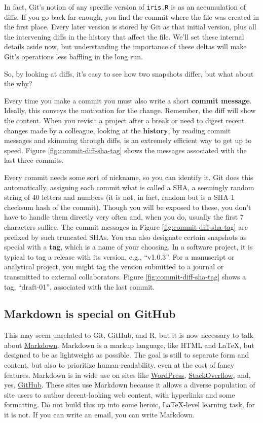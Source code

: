 \documentclass[12pt]{article}
\begin{document}
In fact, Git's notion of any specific version of \texttt{iris.R} is as
an accumulation of diffs. If you go back far enough, you find the commit
where the file was created in the first place. Every later version is
stored by Git as that initial version, plus all the intervening diffs in
the history that affect the file. We'll set these internal details aside
now, but understanding the importance of these deltas will make Git's
operations less baffling in the long run.

So, by looking at diffs, it's easy to see how two snapshots differ, but
what about the why?

Every time you make a commit you must also write a short \textbf{commit
message}. Ideally, this conveys the motivation for the change. Remember,
the diff will show the content. When you revisit a project after a break
or need to digest recent changes made by a colleague, looking at the
\textbf{history}, by reading commit messages and skimming through diffs,
is an extremely efficient way to get up to speed. Figure
\ref{fig:commit-diff-sha-tag} shows the messages associated with the
last three commits.

Every commit needs some sort of nickname, so you can identify it. Git
does this automatically, assigning each commit what is called a SHA, a
seemingly random string of 40 letters and numbers (it is not, in fact,
random but is a SHA-1 checksum hash of the commit). Though you will be
exposed to these, you don't have to handle them directly very often and,
when you do, usually the first 7 characters suffice. The commit messages
in Figure \ref{fig:commit-diff-sha-tag} are prefixed by such truncated
SHAs. You can also designate certain snapshots as special with a
\textbf{tag}, which is a name of your choosing. In a software project,
it is typical to tag a release with its version, e.g., ``v1.0.3''. For a
manuscript or analytical project, you might tag the version submitted to
a journal or transmitted to external collaborators. Figure
\ref{fig:commit-diff-sha-tag} shows a tag, ``draft-01'', associated with
the last commit.

\subsection{Markdown is special on
GitHub}\label{markdown-is-special-on-github}

This may seem unrelated to Git, GitHub, and R, but it is now necessary
to talk about
\href{https://daringfireball.net/projects/markdown/syntax}{Markdown}.
Markdown is a markup language, like HTML and LaTeX, but designed to be
as lightweight as possible. The goal is still to separate form and
content, but also to prioritize human-readability, even at the cost of
fancy features. Markdown is in wide use on sites like
\href{https://en.support.wordpress.com/markdown/}{WordPress},
\href{https://stackoverflow.com/editing-help}{StackOverflow}, and, yes,
\href{https://help.github.com/categories/writing-on-github/}{GitHub}.
These sites use Markdown because it allows a diverse population of site
users to author decent-looking web content, with hyperlinks and some
formatting. Do not build this up into some heroic, LaTeX-level learning
task, for it is not. If you can write an email, you can write Markdown.
\end{document}
